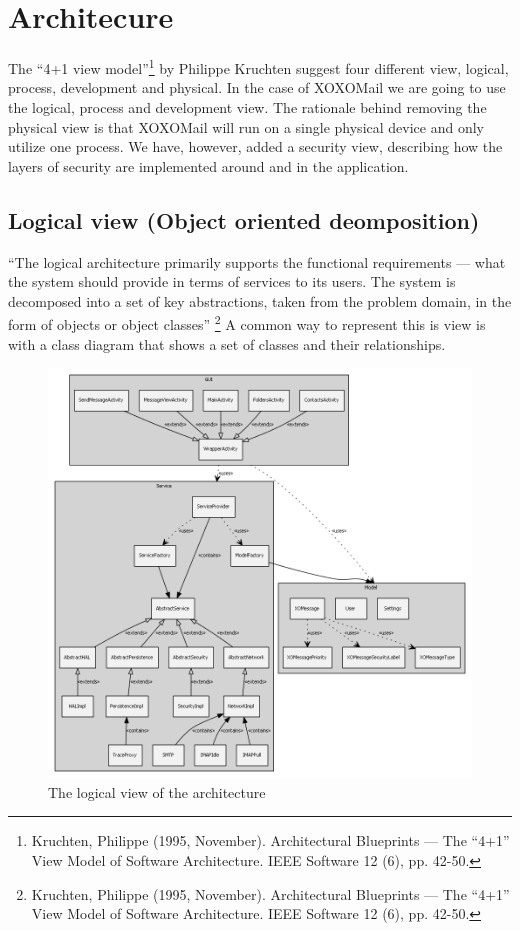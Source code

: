 \section{Architecure}
The “4+1 view model”\footnote{Kruchten, Philippe (1995, November). Architectural Blueprints — The “4+1” View Model of Software Architecture. IEEE Software 12 (6), pp. 42-50.} by Philippe Kruchten suggest four different view, logical, process, development and physical. In the case of XOXOMail we are going to use the logical, process and development view. The rationale behind removing the physical view is that XOXOMail will run on a single physical device and only utilize one process. We have, however, added a security view, describing how the layers of security are implemented around and in the application.

\subsection{Logical view (Object oriented deomposition)}
“The logical architecture primarily supports the functional requirements --- what the system should provide in terms of services to its users. The system is decomposed into a set of key abstractions, taken from the problem domain, in the form of objects or object classes” \footnote{Kruchten, Philippe (1995, November). Architectural Blueprints — The “4+1” View Model of Software Architecture. IEEE Software 12 (6), pp. 42-50.} A common way to represent this is view is with a class diagram that shows a set of classes and their relationships.

\begin{figure}
	\includegraphics[width=\textwidth]{logicalview.png}
	\caption{The logical view of the architecture}
	\label{fig:logicalview}
\end{figure}

